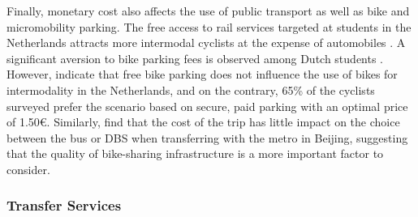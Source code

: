 \begin{refsegment}
Finally, monetary cost also affects the use of public transport as well as bike and micromobility parking. The free access to rail services targeted at students in the Netherlands attracts more intermodal cyclists at the expense of automobiles \textcolor{blue}{\autocite[360]{givoni_access_2007}}. A significant aversion to bike parking fees is observed among Dutch students \textcolor{blue}{\autocite[667]{mil_insights_2020}}. However, \textcolor{blue}{\textcite[10]{molin_bicycle_2015}} indicate that free bike parking does not influence the use of bikes for intermodality in the Netherlands, and on the contrary, 65\% of the cyclists surveyed prefer the scenario based on secure, paid parking with an optimal price of 1.50\euro. Similarly, \textcolor{blue}{\textcite[5]{liu_mode_2022}} find that the cost of the trip has little impact on the choice between the bus or \acrshort{DBS} when transferring with the metro in Beijing, suggesting that the quality of bike-sharing infrastructure is a more important factor to consider.%

\subsubsection*{Transfer Services
    \label{chap2:services-transfert}
    }


\end{refsegment}
